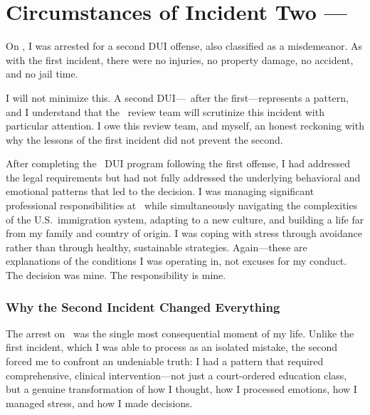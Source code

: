 
\section{Circumstances of Incident Two --- \IncidentTwoDate}

On \IncidentTwoDate, I was arrested for a second DUI offense, also classified as a misdemeanor. As with the first incident, there were no injuries, no property damage, no accident, and no jail time.

I will not minimize this. A second DUI---\TimeBetweenIncidents\ after the first---represents a pattern, and I understand that the \BranchAbbrev\ review team will scrutinize this incident with particular attention. I owe this review team, and myself, an honest reckoning with why the lessons of the first incident did not prevent the second.

After completing the \DUIProgramOneDuration\ DUI program following the first offense, I had addressed the legal requirements but had not fully addressed the underlying behavioral and emotional patterns that led to the decision. I was managing significant professional responsibilities at \EmployerName\ while simultaneously navigating the complexities of the U.S.\ immigration system, adapting to a new culture, and building a life far from my family and country of origin. I was coping with stress through avoidance rather than through healthy, sustainable strategies. Again---these are explanations of the conditions I was operating in, not excuses for my conduct. The decision was mine. The responsibility is mine.

\subsubsection{Why the Second Incident Changed Everything}

The arrest on \IncidentTwoDate\ was the single most consequential moment of my life. Unlike the first incident, which I was able to process as an isolated mistake, the second forced me to confront an undeniable truth: I had a pattern that required comprehensive, clinical intervention---not just a court-ordered education class, but a genuine transformation of how I thought, how I processed emotions, how I managed stress, and how I made decisions.

